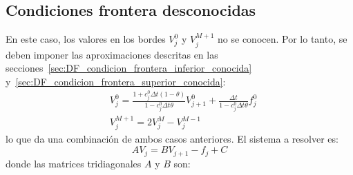 \subsection{Condiciones frontera desconocidas}
En este caso, los valores en los bordes $V_j^0$ y $V_j^{M+1}$ no se conocen. Por lo tanto, se deben imponer las aproximaciones descritas en las secciones~\ref{sec:DF_condicion_frontera_inferior_conocida} y~\ref{sec:DF_condicion_frontera_superior_conocida}:
\begin{align*}
    &V_j^0 = \frac{1 + c_j^0 \Delta t (1-\theta)}{1 - c_j^0 \Delta t \theta} V_{j+1}^0 + \frac{\Delta t}{1 - c_j^0 \Delta t \theta} f_j^0 \\
    &V_j^{M+1} = 2V_j^{M} - V_j^{M-1}
\end{align*}
lo que da una combinación de ambos casos anteriores. El sistema a resolver es:
\begin{equation*}
    \boxed{A V_j = B V_{j+1} - f_j + C}
\end{equation*}
donde las matrices tridiagonales $A$ y $B$ son:

